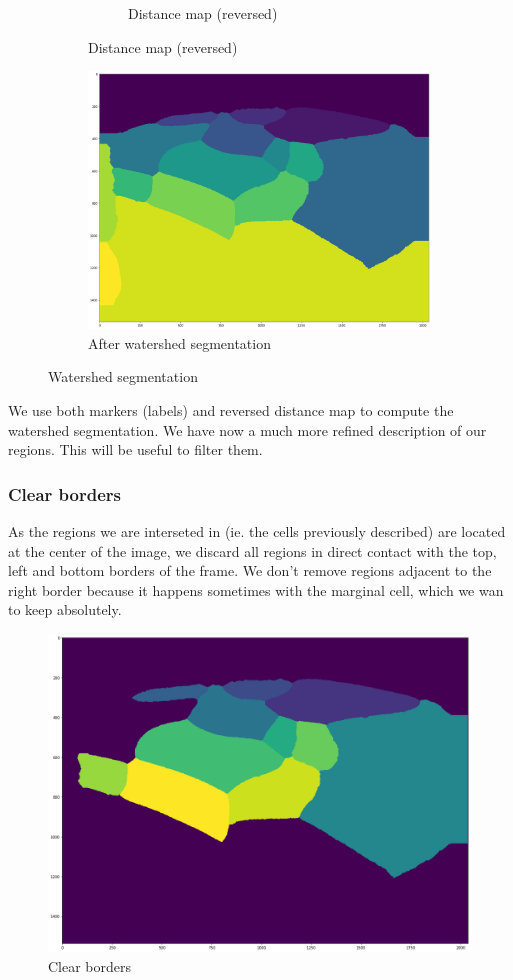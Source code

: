 \documentclass[a4paper]{article}
\begin{document}
\begin{figure}[h]
\begin{subfigure}{.4\textwidth}
\begin{subfigure}{\textwidth}
        \caption{Distance map (reversed)}
    \end{subfigure}
\end{subfigure}
  \centering
\begin{subfigure}{.5\textwidth}
    \includegraphics[width=\linewidth]{figures/watershed.png}
    \caption{After watershed segmentation}
\end{subfigure}
        
\caption{Watershed segmentation}
\end{figure}


We use both markers (labels) and reversed distance map to compute the watershed segmentation. We have now a much more refined description of our regions. This will be useful to filter them. 

\subsubsection{Clear borders}

As the regions we are interseted in (ie. the cells previously described) are located at the center of the image, we discard all regions in direct contact with the top, left and bottom borders of the frame. 
We don't remove regions adjacent to the right border because it happens sometimes with the marginal cell, which we wan to keep absolutely.

\begin{figure}[H]
    \centering
    \includegraphics[width=.6\textwidth]{figures/clear_borders.png}
    \caption{Clear borders}
\end{figure}
\end{document}
